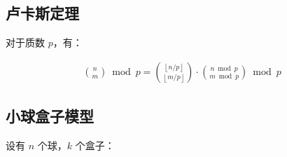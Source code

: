 \documentclass{article}
\begin{document}
\subsection{卢卡斯定理}

对于质数 $p$，有：

$$
\begin{aligned}
\binom{n}{m}\bmod p = \binom{\left\lfloor n/p \right\rfloor}{\left\lfloor m/p\right\rfloor}\cdot\binom{n\bmod p}{m\bmod p}\bmod p
\end{aligned}
$$



\subsection{小球盒子模型}

设有 $n$ 个球，$k$ 个盒子：
\end{document}
